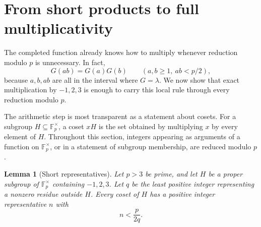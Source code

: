 \documentclass[11pt,a4paper]{article}
\newtheorem{lemma}[theorem]{Lemma}
\theoremstyle{remark}
\numberwithin{equation}{section}
\newcommand{\Fpx}{\mathbb F_p^{\times}}
\newcommand{\lam}{\lambda}
\begin{document}
\section{From short products to full multiplicativity}\label{sec:extension}

The completed function already knows how to multiply whenever reduction
modulo \(p\) is unnecessary. In fact,
\begin{equation}\label{eq:short}
  G(ab)=G(a)G(b)\qquad(a,b\ge1,\ ab<p/2),
\end{equation}
because \(a,b,ab\) are all in the interval where \(G=\lam\).
We now show that exact multiplication by \(-1,2,3\) is enough to carry
this local rule through every reduction modulo \(p\).

The arithmetic step is most transparent as a statement about cosets.
For a subgroup \(H\subseteq\Fpx\), a coset \(xH\) is the set obtained
by multiplying \(x\) by every element of \(H\).
Throughout this section, integers appearing as arguments of a function on
\(\Fpx\), or in a statement of subgroup membership, are reduced modulo \(p\).

\begin{lemma}[Short representatives]\label{lem:cosets}
Let \(p>3\) be prime, and let \(H\) be a proper subgroup of
\(\Fpx\) containing \(-1,2,3\). Let \(q\) be the least positive
integer representing a nonzero residue outside \(H\). Every coset of \(H\)
has a positive integer representative \(n\) with
\[
  n<\frac{p}{2q}.
\]
\end{lemma}
\end{document}
